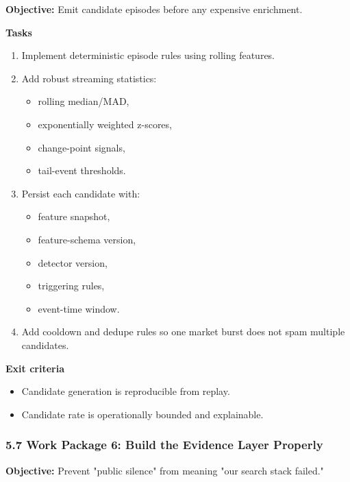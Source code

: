 \documentclass[
]{article}
\providecommand{\tightlist}{%
  \setlength{\itemsep}{0pt}\setlength{\parskip}{0pt}}
\begin{document}
\textbf{Objective:} Emit candidate episodes before any expensive
enrichment.

\textbf{Tasks}

\begin{enumerate}
\def\labelenumi{\arabic{enumi}.}
\tightlist
\item
  Implement deterministic episode rules using rolling features.
\item
  Add robust streaming statistics:

  \begin{itemize}
  \tightlist
  \item
    rolling median/MAD,
  \item
    exponentially weighted z-scores,
  \item
    change-point signals,
  \item
    tail-event thresholds.
  \end{itemize}
\item
  Persist each candidate with:

  \begin{itemize}
  \tightlist
  \item
    feature snapshot,
  \item
    feature-schema version,
  \item
    detector version,
  \item
    triggering rules,
  \item
    event-time window.
  \end{itemize}
\item
  Add cooldown and dedupe rules so one market burst does not spam
  multiple candidates.
\end{enumerate}

\textbf{Exit criteria}

\begin{itemize}
\tightlist
\item
  Candidate generation is reproducible from replay.
\item
  Candidate rate is operationally bounded and explainable.
\end{itemize}

\subsubsection{5.7 Work Package 6: Build the Evidence Layer
Properly}\label{57-work-package-6-build-the-evidence-layer-properly}

\textbf{Objective:} Prevent "public silence" from meaning "our search
stack failed."
\end{document}
